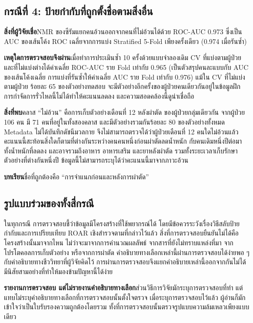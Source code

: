 \documentclass[11pt,a4paper]{article}
\newcommand{\storylabel}[1]{\textbf{#1}\quad}
\begin{document}
\subsection{กรณีที่ 4: ป้ายกำกับที่ถูกตั้งชื่อตามสิ่งอื่น}
\label{sec:case4}

\storylabel{สิ่งที่ผู้วิจัยเชื่อ}NMR ของซีรัมแยกคนอ้วนออกจากคนที่ไม่อ้วนได้ด้วย ROC-AUC 0.973
ซึ่งเป็น AUC ของเส้นโค้ง ROC เฉลี่ยจากการแบ่ง Stratified 5-Fold เพียงครั้งเดียว
(0.974 เมื่อรันซ้ำ)

\storylabel{เหตุใดการตรวจสอบจึงผ่าน}เมื่อทำการประเมินซ้ำ 10 ครั้งด้วยแบบจำลองเดิม
CV ที่แบ่งตามผู้ป่วยและที่ไม่แบ่งต่างได้ค่าเฉลี่ย ROC-AUC ราย Fold เท่ากับ 0.965
(เป็นตัวสรุปคนละแบบกับ AUC ของเส้นโค้งเฉลี่ย
การแบ่งที่รันซ้ำให้ค่าเฉลี่ย AUC ราย Fold เท่ากับ 0.976)
แม้ใน CV ที่ไม่แบ่งตามผู้ป่วย ร้อยละ 65 ของตัวอย่างทดสอบ
จะมีตัวอย่างอีกครั้งของผู้ป่วยคนเดียวกันอยู่ในข้อมูลฝึก
การกำจัดการรั่วไหลนี้ไม่ได้ทำให้คะแนนลดลง และความสอดคล้องนี้ดูน่าเชื่อถือ

\storylabel{สิ่งที่พบ}คลาส ``ไม่อ้วน'' คือการเก็บตัวอย่างเดือนที่ 12 หลังผ่าตัด
ของผู้ป่วยกลุ่มเดียวกัน จากผู้ป่วย 106 คน มี 71 คนที่อยู่ในทั้งสองคลาส
และมีตัวอย่างรวมกันร้อยละ 80 ของตัวอย่างทั้งหมด Metadata ไม่ได้บันทึกดัชนีมวลกาย
จึงไม่สามารถตรวจได้ว่าผู้ป่วยเดือนที่ 12 คนใดไม่อ้วนแล้ว
คะแนนนี้สะท้อนสิ่งใดก็ตามที่ต่างกันระหว่างคนคนหนึ่งก่อนผ่าตัดลดน้ำหนัก
กับคนเดิมหนึ่งปีต่อมา ทั้งน้ำหนักที่ลดลง และอาจรวมถึงอาหาร อาหารเสริม และยาหลังผ่าตัด
รวมทั้งระยะเวลาเก็บรักษาตัวอย่างที่ต่างกันหนึ่งปี
ข้อมูลนี้ไม่สามารถระบุได้ว่าคะแนนนี้มาจากภาวะอ้วน

\storylabel{บทเรียน}ชื่อที่ถูกต้องคือ ``การจำแนกก่อนและหลังการผ่าตัด''

\subsection{รูปแบบร่วมของทั้งสี่กรณี}
ในทุกกรณี การตรวจสอบชี้ว่าข้อมูลมีโครงสร้างที่ใช้พยากรณ์ได้
โดยมีข้อควรระวังเรื่องวิธีสลับป้ายกำกับและการเปรียบเทียบ ROAR เชิงสำรวจตามที่กล่าวไว้แล้ว
สิ่งที่การตรวจสอบยืนยันไม่ได้คือโครงสร้างนั้นมาจากไหน
ไม่ว่าจะมาจากการคำนวณผลลัพธ์ จากสารที่ยังไม่ทราบแหล่งที่มา
จากโปรโตคอลการเก็บตัวอย่าง หรือจากการผ่าตัด
คำอธิบายทางเลือกเหล่านี้ผ่านการตรวจสอบได้ง่ายพอ ๆ กับคำอธิบายทางชีววิทยาที่ผู้วิจัยคิดไว้
การผ่านการตรวจสอบจึงแยกคำอธิบายเหล่านี้ออกจากกันไม่ได้
มีนิสัยสามอย่างที่ทำให้มองข้ามปัญหานี้ได้ง่าย

\storylabel{รายงานการตรวจสอบ แต่ไม่รายงานคำอธิบายทางเลือก}ส่วนวิธีการวิจัยมักระบุการตรวจสอบที่ทำ
แต่แทบไม่ระบุคำอธิบายทางเลือกที่การตรวจสอบนั้นตั้งใจตรวจ
เมื่อระบุการตรวจสอบไว้แล้ว ผู้อ่านก็มักเข้าใจว่าเป็นใบรับรองความถูกต้องโดยรวม
ทั้งที่การตรวจสอบนั้นตรวจรูปแบบความล้มเหลวเพียงแบบเดียว
\end{document}
